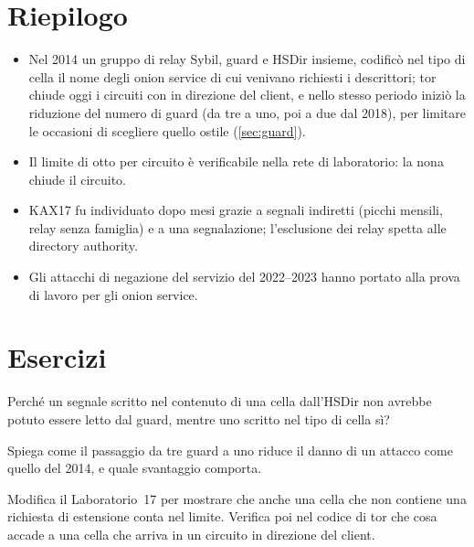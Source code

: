 \section*{Riepilogo}
\begin{itemize}
  \item Nel 2014 un gruppo di relay Sybil, guard e HSDir insieme, codificò nel tipo di cella il nome degli onion service di cui venivano richiesti i descrittori; tor chiude oggi i circuiti con  in direzione del client, e nello stesso periodo iniziò la riduzione del numero di guard (da tre a uno, poi a due dal 2018), per limitare le occasioni di scegliere quello ostile (\cref{sec:guard}).
  \item Il limite di otto  per circuito è verificabile nella rete di laboratorio: la nona chiude il circuito.
  \item KAX17 fu individuato dopo mesi grazie a segnali indiretti (picchi mensili, relay senza famiglia) e a una segnalazione; l'esclusione dei relay spetta alle directory authority.
  \item Gli attacchi di negazione del servizio del 2022--2023 hanno portato alla prova di lavoro per gli onion service.
\end{itemize}

\section*{Esercizi}

\begin{esercizio}[1]\label{es:27-campo}
Perché un segnale scritto nel contenuto di una cella dall'HSDir non avrebbe potuto essere letto dal guard, mentre uno scritto nel tipo di cella sì?
\end{esercizio}

\begin{esercizio}[1]\label{es:27-uno}
Spiega come il passaggio da tre guard a uno riduce il danno di un attacco come quello del 2014, e quale svantaggio comporta.
\end{esercizio}

\begin{esercizio}[2]\label{es:27-verso}
Modifica il Laboratorio~17 per mostrare che anche una cella  che non contiene una richiesta di estensione conta nel limite. Verifica poi nel codice di tor che cosa accade a una cella  che arriva in un circuito in direzione del client.
\end{esercizio}

